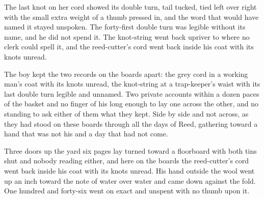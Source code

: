 The last knot on her cord showed its double turn, tail tucked, tied left over right with the small extra weight of a thumb pressed in, and the word that would have named it stayed unspoken. The forty-first double turn was legible without its name, and he did not spend it. The knot-string went back upriver to  where no clerk could spell it, and the reed-cutter's cord went back inside his coat with its knots unread.

The boy kept the two records on the boards apart: the grey cord in a working man's coat with its knots unread, the knot-string at a trap-keeper's waist with its last double turn legible and unnamed. Two private accounts within a dozen paces of the basket and no finger of his long enough to lay one across the other, and no standing to ask either of them what they kept. Side by side and not across, as they had stood on these boards through all the days of Reed, gathering toward a hand that was not his and a day that had not come.

Three doors up the yard six pages lay turned toward a floorboard with both tins shut and nobody reading either, and here on the boards the reed-cutter's cord went back inside his coat with its knots unread. His hand outside the wool went up an inch toward the note of water over water and came down against the fold. One hundred and forty-six went on exact and unspent with no thumb upon it.
